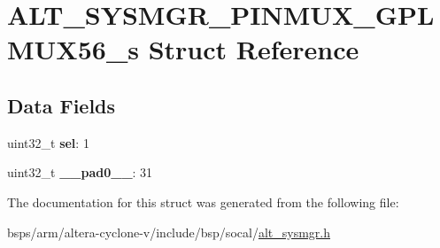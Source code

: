 \hypertarget{structALT__SYSMGR__PINMUX__GPLMUX56__s}{}\section{A\+L\+T\+\_\+\+S\+Y\+S\+M\+G\+R\+\_\+\+P\+I\+N\+M\+U\+X\+\_\+\+G\+P\+L\+M\+U\+X56\+\_\+s Struct Reference}
\label{structALT__SYSMGR__PINMUX__GPLMUX56__s}
\subsection*{Data Fields}
\begin{DoxyCompactItemize}
\item 
\mbox{\label{structALT__SYSMGR__PINMUX__GPLMUX56__s_abed5ff70d3e57a7b5f1b3c2b9d32563e}} 
uint32\+\_\+t {\bfseries sel}\+: 1
\item 
\mbox{\label{structALT__SYSMGR__PINMUX__GPLMUX56__s_aaa36393c8a9005053a98e5b57f78bc87}} 
uint32\+\_\+t {\bfseries \+\_\+\+\_\+pad0\+\_\+\+\_\+}\+: 31
\end{DoxyCompactItemize}


The documentation for this struct was generated from the following file\+:\begin{DoxyCompactItemize}
\item 
bsps/arm/altera-\/cyclone-\/v/include/bsp/socal/\mbox{\hyperlink{alt__sysmgr_8h}{alt\+\_\+sysmgr.\+h}}\end{DoxyCompactItemize}
